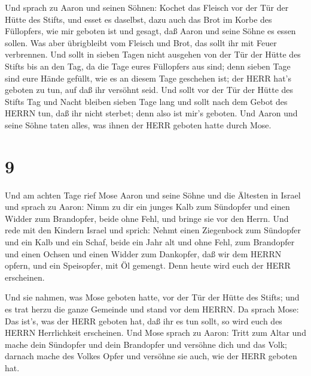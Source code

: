  Und sprach zu Aaron und seinen Söhnen: Kochet das Fleisch
vor der Tür der Hütte des Stifts, und esset es daselbst, dazu auch das
Brot im Korbe des Füllopfers, wie mir geboten ist und gesagt, daß Aaron
und seine Söhne es essen sollen.  Was aber übrigbleibt vom
Fleisch und Brot, das sollt ihr mit Feuer verbrennen.  Und
sollt in sieben Tagen nicht ausgehen von der Tür der Hütte des Stifts
bis an den Tag, da die Tage eures Füllopfers aus sind; denn sieben Tage
sind eure Hände gefüllt,  wie es an diesem Tage geschehen
ist; der HERR hat's geboten zu tun, auf daß ihr versöhnt seid.
 Und sollt vor der Tür der Hütte des Stifts Tag und Nacht
bleiben sieben Tage lang und sollt nach dem Gebot des HERRN tun, daß ihr
nicht sterbet; denn also ist mir's geboten.  Und Aaron und
seine Söhne taten alles, was ihnen der HERR geboten hatte durch Mose.

\hypertarget{section-8}{%
\section{9}\label{section-8}}

 Und am achten Tage rief Mose Aaron und seine Söhne und die
Ältesten in Israel  und sprach zu Aaron: Nimm zu dir ein
junges Kalb zum Sündopfer und einen Widder zum Brandopfer, beide ohne
Fehl, und bringe sie vor den Herrn.  Und rede mit den
Kindern Israel und sprich: Nehmt einen Ziegenbock zum Sündopfer und ein
Kalb und ein Schaf, beide ein Jahr alt und ohne Fehl, zum Brandopfer
 und einen Ochsen und einen Widder zum Dankopfer, daß wir
dem HERRN opfern, und ein Speisopfer, mit Öl gemengt. Denn heute wird
euch der HERR erscheinen.

 Und sie nahmen, was Mose geboten hatte, vor der Tür der
Hütte des Stifts; und es trat herzu die ganze Gemeinde und stand vor dem
HERRN.  Da sprach Mose: Das ist's, was der HERR geboten hat,
daß ihr es tun sollt, so wird euch des HERRN Herrlichkeit erscheinen.
 Und Mose sprach zu Aaron: Tritt zum Altar und mache dein
Sündopfer und dein Brandopfer und versöhne dich und das Volk; darnach
mache des Volkes Opfer und versöhne sie auch, wie der HERR geboten hat.

